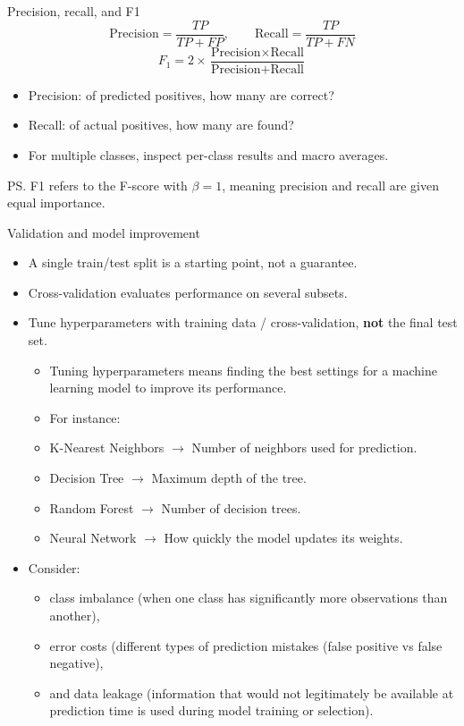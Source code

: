 \documentclass[aspectratio=43,11pt]{beamer}
\begin{document}
\begin{frame}{Precision, recall, and F1}
\[
\text{Precision}=\frac{TP}{TP+FP},\qquad
\text{Recall}=\frac{TP}{TP+FN}
\]
\vspace{1ex}
\[
F_1=2\times\frac{\text{Precision}\times\text{Recall}}{\text{Precision}+\text{Recall}}
\]
\begin{itemize}
  \item Precision: of predicted positives, how many are correct?
  \item Recall: of actual positives, how many are found?
  \item For multiple classes, inspect per-class results and macro averages.
\end{itemize}
\vspace{3ex}
\footnotesize{PS. F1 refers to the F-score with $\beta = 1$, meaning precision and recall are given equal importance.}
\end{frame}

\begin{frame}{Validation and model improvement}
\begin{itemize}
  \item A single train/test split is a starting point, not a guarantee.
  \item Cross-validation evaluates performance on several subsets.
  \item Tune hyperparameters with training data / cross-validation, \textbf{not} the final test set.
  \begin{itemize}
  \item Tuning hyperparameters means finding the best settings for a machine learning model to improve its performance.
  \item[]  For instance:
  \item \footnotesize{K-Nearest Neighbors $\rightarrow$ Number of neighbors used for prediction.}
  \item \footnotesize{Decision Tree $\rightarrow$ Maximum depth of the tree.}
  \item \footnotesize{Random Forest $\rightarrow$ Number of decision trees.}
  \item \footnotesize{Neural Network $\rightarrow$ How quickly the model updates its weights.}
  \end{itemize}
  \item Consider:
  \begin{itemize}
  \item class imbalance (when one class has significantly more observations than another),
  \item error costs (different types of prediction mistakes (false positive vs false negative),
  \item and data leakage (information that would not legitimately be available at prediction time is used during model training or selection).
  \end{itemize}
\end{itemize}
\end{frame}
\end{document}
